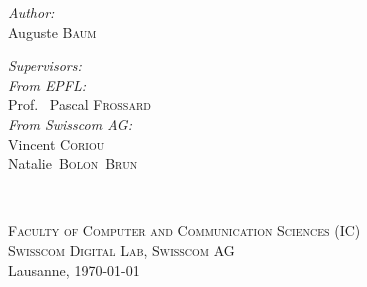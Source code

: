 \begin{titlepage}
\begin{center}
    \begin{minipage}[t]{0.4\textwidth}
    \begin{flushleft} \large
    \emph{Author:}\\
    Auguste \textsc{Baum}
    \end{flushleft}
    \end{minipage}
    \begin{minipage}[t]{0.4\textwidth}
    \begin{flushright} \large
    \emph{Supervisors:} \\
    [0.5cm]
    \emph{From EPFL:}\\
    Prof.~ Pascal \textsc{Frossard}\\
    [0.2cm]
    \emph{From Swisscom AG:}\\
    Vincent \textsc{Coriou}\\
    Natalie~\textsc{Bolon~Brun}
    \end{flushright}
    \end{minipage}\\[3cm]
     
    \vfill
    
    \small{\textsc{Faculty of Computer and Communication Sciences (IC)}}\\
    \small{\textsc{Swisscom Digital Lab, Swisscom AG}}\\
    [1cm]
    
    {\large Lausanne, \today}\\[2cm] %
     
    \end{center}
\end{titlepage}